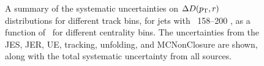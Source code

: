 \begin{figure}
{\begin{tabular}{cc}
\end{tabular} }
   \caption{A summary of the systematic uncertainties on $\Delta\mbox{$D( p_{\mathrm{T}}, r)$}$ distributions for different track \pt bins, for jets with \pt\ 158--200  \GeV, as a function of \rvar\ for different centrality bins. The uncertainties from the JES, JER, UE, tracking, unfolding, and MCNonClosure are shown, along with the total systematic uncertainty from all sources. }
      \label{fig:deltadptr_sys_uncert_A1}
\end{figure}

 \begin{figure}
\end{figure}
